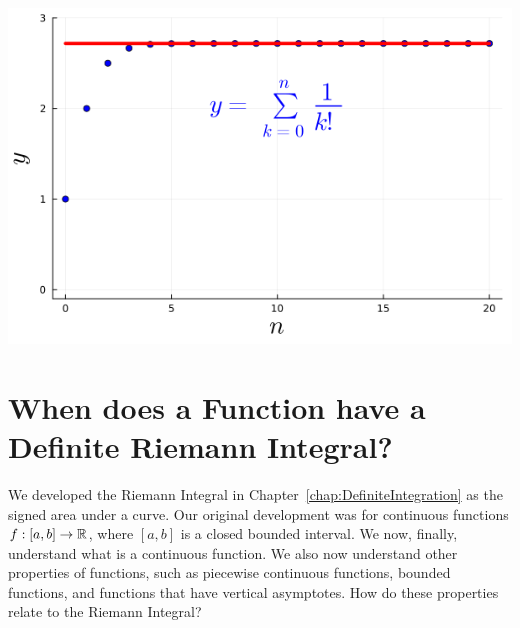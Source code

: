 \begin{enumerate}
    \begin{center}
    \includegraphics[width=0.45\columnwidth]{graphics/Chap04/BoundsAsymptotesH.png}
    \end{center}
    \end{enumerate}
    \Qed

\section{When does a Function have a Definite Riemann Integral?}
\label{sec:WhenRiemannDefiniteIntegral}

We developed the Riemann Integral in Chapter~\ref{chap:DefiniteIntegration} as the signed area under a curve. Our original development was for continuous functions $f:[a, b] \to \mathbb R$, where $[a, b]$ is a closed bounded interval. We now, finally, understand what is a continuous function. We also now understand other properties of functions, such as piecewise continuous functions, bounded functions, and functions that have vertical asymptotes. How do these properties relate to the Riemann Integral? 

